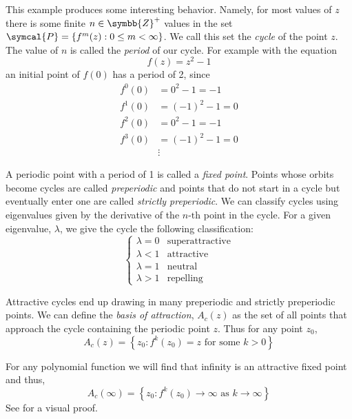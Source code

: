 \documentclass[11pt,hidelinks]{article}
\numberwithin{equation}{section} %
\newenvironment{talign}{\begin{equation}\begin{aligned}}{\end{aligned}\end{equation}}
\theoremstyle{bf}
\theoremstyle{indentbf}
\begin{document}
This example produces some interesting behavior. Namely, for most values of \(z\) there is some finite \(n \in \symbb{Z}^+\) values in the set \(\symcal{P} = \left\{ f^m(z) : 0 \leq m < \infty \right\}\). We call this set the \emph{cycle} of the point \(z\). The value of \(n\) is called the \emph{period} of our cycle. For example with the equation
\begin{equation}
f(z) = z^2 - 1
\end{equation}
an initial point of \(f(0)\) has a period of 2, since
\begin{talign}
    f^0(0) & = 0^2 - 1 = -1 \\
    f^1(0) & = (-1)^2 - 1 = 0 \\
    f^2(0) & = 0^2 - 1 = -1 \\
    f^3(0) & = (-1)^2 - 1 = 0 \\
    & \vdots
\end{talign}

A periodic point with a period of 1 is called a \emph{fixed point}. Points whose orbits become cycles are called \emph{preperiodic} and points that do not start in a cycle but eventually enter one are called \emph{strictly preperiodic}. \cite{dang:2002} We can classify cycles using eigenvalues given by the derivative of the \(n\text{-th}\) point in the cycle. For a given eigenvalue, \(\lambda\), we give the cycle the following classification:
\[\begin{cases}
    \lambda = 0 & \text{superattractive} \\
    \lambda < 1 & \text{attractive} \\
    \lambda = 1 & \text{neutral} \\
    \lambda > 1 & \text{repelling}
\end{cases}\]

Attractive cycles end up drawing in many preperiodic and strictly preperiodic points. We can define the \emph{basis of attraction}, \(A_c(z)\) as the set of all points that approach the cycle containing the periodic point \(z\). Thus for any point \(z_0\),
\begin{equation}
    A_c(z) = \left\{ z_0 : f^k(z_0) = z \text{ for some } k > 0 \right\}
\end{equation}

For any polynomial function we will find that infinity is an attractive fixed point and thus,
\begin{equation}
    A_c(\infty) = \left\{ z_0 : f^k(z_0) \to \infty \text{ as } k \to \infty \right\}
\end{equation}
See \cite{barnsley:1988} for a visual proof.
\end{document}
